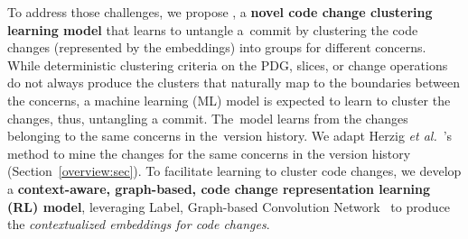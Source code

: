 



To address those challenges, we propose {\bf \tool}, a {\bf novel code
  change clustering learning model} that learns to untangle a~commit
by clustering the code changes (represented by the embeddings) into
groups for different concerns.
%
While deterministic clustering criteria on the PDG, slices, or change
operations do not always produce the clusters that naturally map to
the boundaries between the concerns, a machine learning (ML) model is
expected to learn to cluster the changes, thus, untangling a
commit. The~model learns from the changes belonging to the same
concerns in the~version history. We adapt Herzig {\em et
  al.}~\cite{kim-emse16}'s method to mine the changes for the same
concerns in the version history (Section~\ref{overview:sec}).
%
To facilitate learning to cluster code changes, we develop a {\bf
  context-aware, graph-based, code change representation learning (RL)
  model}, leveraging Label, Graph-based Convolution
Network~\cite{label-gcn} to produce the {\em contextualized embeddings
  for code changes}.

